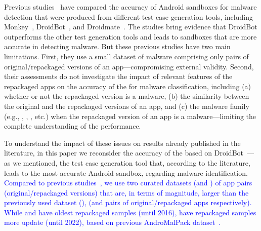Previous studies~\cite{DBLP:conf/wcre/BaoLL18,DBLP:journals/jss/CostaMMSSBNR22} 
have compared the accuracy of  Android sandboxes for malware detection 
that were produced from different test case generation tools, including Monkey~\cite{Monkey}, DroidBot~\cite{DBLP:conf/icse/LiYGC17}, and Droidmate~\cite{DBLP:conf/kbse/BorgesHZ18}.
The studies bring evidence that 
DroidBot outperforms the other test generation tools and leads to sandboxes that are more accurate in detecting malware.
But these previous studies have two main limitations.
First, they use a small dataset of malware comprising only \appsSmall pairs of original/repackaged versions of an app---compromising external validity. Second, their assessments do not investigate
the impact of relevant features of the repackaged apps on the accuracy of the \mas for malware classification, including
(a) whether or not the repackaged version is a malware, (b) the similarity between the original and the repackaged versions of an app,
and (c) the malware family (e.g., , , , etc.) when the repackaged
version of an app is a malware---limiting the complete understanding of the \mas performance. 



To understand the impact of these issues on results already published in the literature, in this paper we reconsider the accuracy of the \mas based on
DroidBot~\cite{DBLP:conf/icse/LiYGC17}---as we mentioned, the test case generation tool that, according to the literature, leads to the most accurate Android sandbox, regarding malware identification. \textcolor{blue}{Compared to previous studies~\cite{DBLP:conf/wcre/BaoLL18,DBLP:conf/scam/CostaMCMVBC20},
we use two curated datasets (\cds and \nds) of app pairs (original/repackaged versions) that are, in terms of magnitude, larger than the previously used dataset (\sds), (\apps and \napps pairs of original/repackaged apps respectively). While \sds and \cds have oldest repackaged samples (until 2016), \nds have repackaged samples more update (until 2022), based on previous AndroMalPack dataset~\cite{andromalpack}.}

